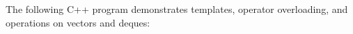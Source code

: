 \documentclass[12pt,letterpaper,oneside]{article}
\begin{document}
The following C++ program demonstrates templates, operator overloading, and operations on vectors and deques:
\inputminted{cpp}{demos.cpp}
\end{document}
